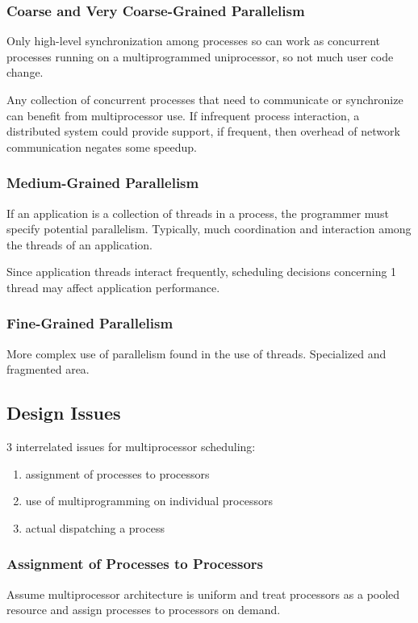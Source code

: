 \documentclass[11pt]{article}
\begin{document}
\subsubsection{Coarse and Very Coarse-Grained Parallelism}
\label{sec:org8909b3c}
Only high-level synchronization among processes so can work as concurrent processes
running on a multiprogrammed uniprocessor, so not much user code change.

Any collection of concurrent processes that need to communicate or synchronize can
benefit from multiprocessor use.
If infrequent process interaction, a distributed system could provide support,
if frequent, then overhead of network communication negates some speedup.
\subsubsection{Medium-Grained Parallelism}
\label{sec:orgabdef84}
If an application is a collection of threads in a process, the programmer must
specify potential parallelism.
Typically, much coordination and interaction among the threads of an application.

Since application threads interact frequently, scheduling decisions concerning 1
thread may affect application performance.
\subsubsection{Fine-Grained Parallelism}
\label{sec:org884dde4}
More complex use of parallelism found in the use of threads.
Specialized and fragmented area.
\subsection{Design Issues}
\label{sec:org699926d}
3 interrelated issues for multiprocessor scheduling:
\begin{enumerate}
\item assignment of processes to processors
\item use of multiprogramming on individual processors
\item actual dispatching a process
\end{enumerate}
\subsubsection{Assignment of Processes to Processors}
\label{sec:orgcbd14b2}
Assume multiprocessor architecture is uniform and treat processors as a pooled
resource and assign processes to processors on demand.
\end{document}
